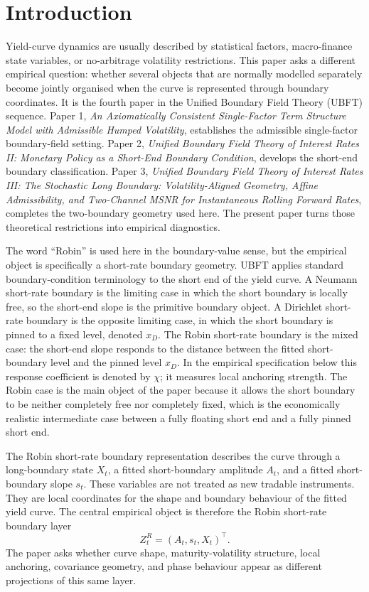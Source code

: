 \documentclass[11pt]{article}
\begin{document}
\section{Introduction}

Yield-curve dynamics are usually described by statistical factors, macro-finance state variables, or no-arbitrage volatility restrictions. This paper asks a different empirical question: whether several objects that are normally modelled separately become jointly organised when the curve is represented through boundary coordinates. It is the fourth paper in the Unified Boundary Field Theory (UBFT) sequence. Paper 1, \emph{An Axiomatically Consistent Single-Factor Term Structure Model with Admissible Humped Volatility}, establishes the admissible single-factor boundary-field setting. Paper 2, \emph{Unified Boundary Field Theory of Interest Rates II: Monetary Policy as a Short-End Boundary Condition}, develops the short-end boundary classification. Paper 3, \emph{Unified Boundary Field Theory of Interest Rates III: The Stochastic Long Boundary: Volatility-Aligned Geometry, Affine Admissibility, and Two-Channel MSNR for Instantaneous Rolling Forward Rates}, completes the two-boundary geometry used here. The present paper turns those theoretical restrictions into empirical diagnostics.

The word ``Robin'' is used here in the boundary-value sense, but the empirical object is specifically a short-rate boundary geometry. UBFT applies standard boundary-condition terminology to the short end of the yield curve. A Neumann short-rate boundary is the limiting case in which the short boundary is locally free, so the short-end slope is the primitive boundary object. A Dirichlet short-rate boundary is the opposite limiting case, in which the short boundary is pinned to a fixed level, denoted $x_D$. The Robin short-rate boundary is the mixed case: the short-end slope responds to the distance between the fitted short-boundary level and the pinned level $x_D$. In the empirical specification below this response coefficient is denoted by $\chi$; it measures local anchoring strength. The Robin case is the main object of the paper because it allows the short boundary to be neither completely free nor completely fixed, which is the economically realistic intermediate case between a fully floating short end and a fully pinned short end.

The Robin short-rate boundary representation describes the curve through a long-boundary state $X_t$, a fitted short-boundary amplitude $A_t$, and a fitted short-boundary slope $s_t$. These variables are not treated as new tradable instruments. They are local coordinates for the shape and boundary behaviour of the fitted yield curve. The central empirical object is therefore the Robin short-rate boundary layer
\begin{equation}
 Z_t^R=(A_t,s_t,X_t)^\top.
\end{equation}
The paper asks whether curve shape, maturity-volatility structure, local anchoring, covariance geometry, and phase behaviour appear as different projections of this same layer.
\end{document}
